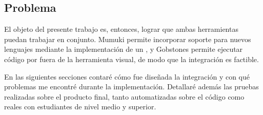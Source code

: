 \subsection{Problema}
El objeto del presente trabajo es, entonces, lograr que ambas herramientas puedan trabajar en conjunto. Mumuki permite incorporar soporte para nuevos lenguajes mediante la implementación de un \runner, y Gobstones permite ejecutar código por fuera de la herramienta visual, de modo que la integración es factible.

En las siguientes secciones contaré cómo fue diseñada la integración y con qué problemas me encontré durante la implementación. Detallaré además las pruebas realizadas sobre el producto final, tanto automatizadas sobre el código como reales con estudiantes de nivel medio y superior.
